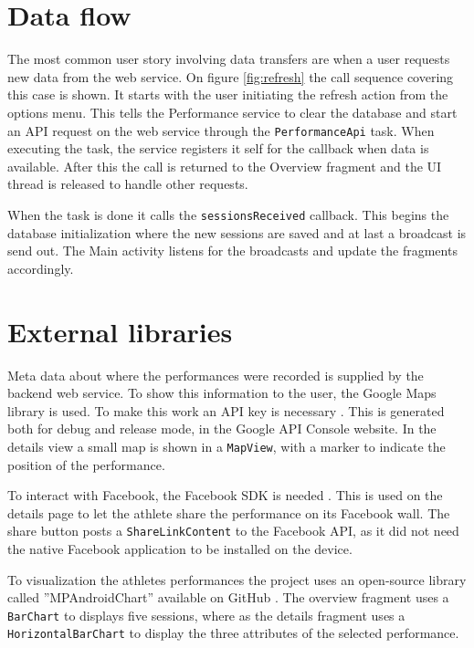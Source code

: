 
\section{Data flow}
The most common user story involving data transfers are when a user requests new data from the web service. On figure \ref{fig:refresh} the call sequence covering this case is shown. It starts with the user initiating the refresh action from the options menu. This tells the Performance service to clear the database and start an API request on the web service through the \verb|PerformanceApi| task. When executing the task, the service registers it self for the callback when data is available. After this the call is returned to the Overview fragment and the UI thread is released to handle other requests.

When the task is done it calls the \verb|sessionsReceived| callback. This begins the database initialization where the new sessions are saved and at last a broadcast is send out. The Main activity listens for the broadcasts and update the fragments accordingly.


\section{External libraries}
Meta data about where the performances were recorded is supplied by the backend web service. To show this information to the user, the Google Maps library is used. To make this work an API key is necessary \citep{google:console}. This is generated both for debug and release mode, in the Google API Console website. In the details view a small map is shown in a \verb|MapView|, with a marker to indicate the position of the performance.

To interact with Facebook, the Facebook SDK is needed \citep{facebook:started}. This is used on the details page to let the athlete share the performance on its Facebook wall. The share button posts a \verb|ShareLinkContent| to the Facebook API, as it did not need the native Facebook application to be installed on the device.

To visualization the athletes performances the project uses an open-source library called ''MPAndroidChart'' available on GitHub \citep{mpcharts}. The overview fragment uses a \verb|BarChart| to displays five sessions, where as the details fragment uses a \verb|HorizontalBarChart| to display the three attributes of the selected performance.
